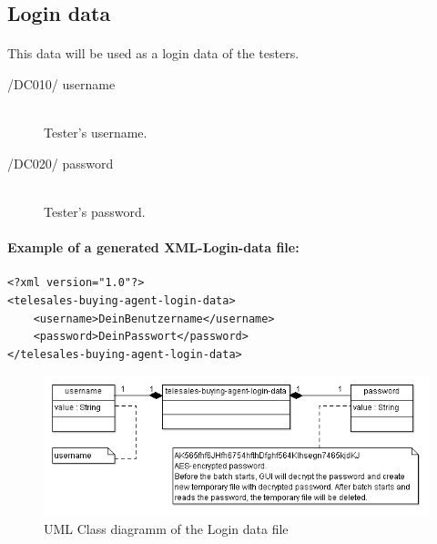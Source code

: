 \subsection{Login data}
\paragraph{}This data will be used as a login data of the testers.
\begin{description}
\item[/DC010/ username]\hfill\\ Tester's username.
\item[/DC020/ password]\hfill\\ Tester's password.
\end{description}

\paragraph{Example of a generated XML-Login-data file:}
\begin{verbatim}
<?xml version="1.0"?>
<telesales-buying-agent-login-data>
    <username>DeinBenutzername</username>
    <password>DeinPasswort</password>
</telesales-buying-agent-login-data>
\end{verbatim}

\begin{figure}[h!]
\centering
\includegraphics[width=\textwidth]{d_class_login-data.png}
\caption{UML Class diagramm of the Login data file}
\end{figure}
